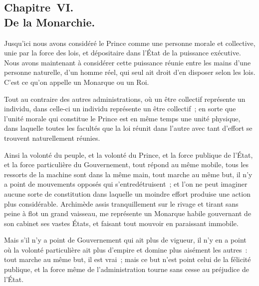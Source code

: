 \documentclass[french,twoside]{book} %
\begin{document}
\subsection[{Chapitre VI. De la Monarchie.}]{Chapitre VI. \\
De la Monarchie.}
\noindent Jusqu’ici nous avons considéré le Prince comme une personne morale et collective, unie par la force des lois, et dépositaire dans l’État de la puissance exécutive. Nous avons maintenant à considérer cette puissance réunie entre les mains d’une personne naturelle, d’un homme réel, qui seul ait droit d’en disposer selon les lois. C’est ce qu’on appelle un Monarque ou un Roi.\par
Tout au contraire des autres administrations, où un être collectif représente un individu, dans celle-ci un individu représente un être collectif ; en sorte que l’unité morale qui constitue le Prince est en même temps une unité physique, dans laquelle toutes les facultés que la loi réunit dans l’autre avec tant d’effort se trouvent naturellement réunies.\par
Ainsi la volonté du peuple, et la volonté du Prince, et la force publique de l’État, et la force particulière du Gouvernement, tout répond au même mobile, tous les ressorts de la machine sont dans la même main, tout marche au même but, il n’y a point de mouvements opposés qui s’entredétruisent ; et l’on ne peut imaginer aucune sorte de constitution dans laquelle un moindre effort produise une action plus considérable. Archimède assis tranquillement sur le rivage et tirant sans peine à flot un grand vaisseau, me représente un Monarque habile gouvernant de son cabinet ses vastes États, et faisant tout mouvoir en paraissant immobile.\par
Mais s’il n’y a point de Gouvernement qui ait plus de vigueur, il n’y en a point où la volonté particulière ait plus d’empire et domine plus aisément les autres : tout marche au même but, il est vrai ; mais ce but n’est point celui de la félicité publique, et la force même de l’administration tourne sans cesse au préjudice de l’État.\par
\end{document}
